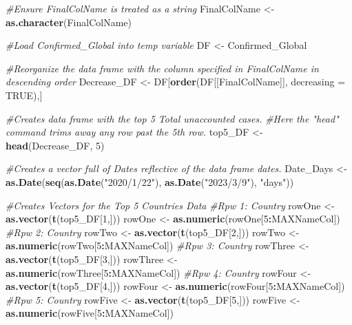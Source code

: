 \documentclass[
]{article}
\newenvironment{Shaded}{\begin{snugshade}}{\end{snugshade}}
\newcommand{\AttributeTok}[1]{\textcolor[rgb]{0.13,0.29,0.53}{#1}}
\newcommand{\CommentTok}[1]{\textcolor[rgb]{0.56,0.35,0.01}{\textit{#1}}}
\newcommand{\ConstantTok}[1]{\textcolor[rgb]{0.56,0.35,0.01}{#1}}
\newcommand{\DecValTok}[1]{\textcolor[rgb]{0.00,0.00,0.81}{#1}}
\newcommand{\FunctionTok}[1]{\textcolor[rgb]{0.13,0.29,0.53}{\textbf{#1}}}
\newcommand{\NormalTok}[1]{#1}
\newcommand{\OtherTok}[1]{\textcolor[rgb]{0.56,0.35,0.01}{#1}}
\newcommand{\SpecialCharTok}[1]{\textcolor[rgb]{0.81,0.36,0.00}{\textbf{#1}}}
\newcommand{\StringTok}[1]{\textcolor[rgb]{0.31,0.60,0.02}{#1}}
\begin{document}
\begin{Shaded}
\begin{Highlighting}[]
\CommentTok{\#Ensure FinalColName is treated as a string}
\NormalTok{FinalColName }\OtherTok{\textless{}{-}} \FunctionTok{as.character}\NormalTok{(FinalColName)}

\CommentTok{\#Load Confirmed\_Global into temp variable}
\NormalTok{DF }\OtherTok{\textless{}{-}}\NormalTok{ Confirmed\_Global}

\CommentTok{\#Reorganize the data frame with the column specified in FinalColName in descending order}
\NormalTok{Decrease\_DF }\OtherTok{\textless{}{-}}\NormalTok{ DF[}\FunctionTok{order}\NormalTok{(DF[[FinalColName]], }\AttributeTok{decreasing =} \ConstantTok{TRUE}\NormalTok{),]}


\CommentTok{\#Creates data frame with the top 5 Total unaccounted cases.}
\CommentTok{\#Here the "head" command trims away any row past the 5th row. }
\NormalTok{top5\_DF }\OtherTok{\textless{}{-}} \FunctionTok{head}\NormalTok{(Decrease\_DF, }\DecValTok{5}\NormalTok{)}

\CommentTok{\#Creates a vector full of Dates reflective of the data frame dates. }
\NormalTok{Date\_Days }\OtherTok{\textless{}{-}} \FunctionTok{as.Date}\NormalTok{(}\FunctionTok{seq}\NormalTok{(}\FunctionTok{as.Date}\NormalTok{(}\StringTok{"2020/1/22"}\NormalTok{), }\FunctionTok{as.Date}\NormalTok{(}\StringTok{"2023/3/9"}\NormalTok{), }\StringTok{"days"}\NormalTok{))}


\CommentTok{\#Creates Vectors for the Top 5 Countries Data}
\CommentTok{\#Rpw 1: Country}
\NormalTok{rowOne }\OtherTok{\textless{}{-}} \FunctionTok{as.vector}\NormalTok{(}\FunctionTok{t}\NormalTok{(top5\_DF[}\DecValTok{1}\NormalTok{,]))}
\NormalTok{rowOne }\OtherTok{\textless{}{-}} \FunctionTok{as.numeric}\NormalTok{(rowOne[}\DecValTok{5}\SpecialCharTok{:}\NormalTok{MAXNameCol])}
\CommentTok{\#Rpw 2: Country}
\NormalTok{rowTwo }\OtherTok{\textless{}{-}} \FunctionTok{as.vector}\NormalTok{(}\FunctionTok{t}\NormalTok{(top5\_DF[}\DecValTok{2}\NormalTok{,]))}
\NormalTok{rowTwo }\OtherTok{\textless{}{-}} \FunctionTok{as.numeric}\NormalTok{(rowTwo[}\DecValTok{5}\SpecialCharTok{:}\NormalTok{MAXNameCol])}
\CommentTok{\#Rpw 3: Country}
\NormalTok{rowThree }\OtherTok{\textless{}{-}} \FunctionTok{as.vector}\NormalTok{(}\FunctionTok{t}\NormalTok{(top5\_DF[}\DecValTok{3}\NormalTok{,]))}
\NormalTok{rowThree }\OtherTok{\textless{}{-}} \FunctionTok{as.numeric}\NormalTok{(rowThree[}\DecValTok{5}\SpecialCharTok{:}\NormalTok{MAXNameCol])}
\CommentTok{\#Rpw 4: Country}
\NormalTok{rowFour }\OtherTok{\textless{}{-}} \FunctionTok{as.vector}\NormalTok{(}\FunctionTok{t}\NormalTok{(top5\_DF[}\DecValTok{4}\NormalTok{,]))}
\NormalTok{rowFour }\OtherTok{\textless{}{-}} \FunctionTok{as.numeric}\NormalTok{(rowFour[}\DecValTok{5}\SpecialCharTok{:}\NormalTok{MAXNameCol])}
\CommentTok{\#Rpw 5: Country}
\NormalTok{rowFive }\OtherTok{\textless{}{-}} \FunctionTok{as.vector}\NormalTok{(}\FunctionTok{t}\NormalTok{(top5\_DF[}\DecValTok{5}\NormalTok{,]))}
\NormalTok{rowFive }\OtherTok{\textless{}{-}} \FunctionTok{as.numeric}\NormalTok{(rowFive[}\DecValTok{5}\SpecialCharTok{:}\NormalTok{MAXNameCol])}


\end{Highlighting}
\end{Shaded}
\end{document}
